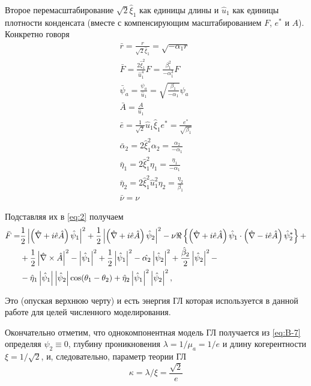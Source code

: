 Второе перемасштабирование \( \sqrt{2}\hat{\xi}_1 \) как единицы длины
и \( \hat{u}_1 \) как единицы плотности конденсата (вместе с компенсирующим
масштабированием \( F \), \( e^* \) и \( A \)). Конкретно говоря
\begin{gather}
  \bar{r} = \frac{r}{\sqrt{2}\hat{\xi}_1} = \sqrt{-\alpha_1 r} \nonumber \\
  \bar{F} = \frac{2\hat{\xi}^2_1}{\hat{u}^4_1}F =
    \frac{\beta^2_1}{-\alpha^3_1}F \nonumber \\
  \bar{\psi}_a = \frac{\psi_a}{\hat{u}_1} =
    \sqrt{\frac{\beta_1}{-\alpha_1}}\psi_a \nonumber \\
  \bar{A} = \frac{A}{\hat{u}_1} \\
  \bar{e} = \frac{1}{\sqrt{2}}\hat{u}_1\hat{\xi}_1 e^* =
    \frac{e^*}{\sqrt{\beta_1}} \nonumber \\
  \bar{\alpha}_2 = 2\hat{\xi}^2_1 \alpha_2 = \frac{\alpha_2}{-\alpha_1}
    \nonumber \\
  \bar{\eta}_1 = 2\hat{\xi}^2_1 \eta_1 = \frac{\eta_1}{-\alpha_1} \nonumber \\
  \bar{\eta}_2 = 2\hat{\xi}^2_1 \hat{u}^2_1 \eta_2 =
    \frac{\eta_2}{\beta_1} \nonumber \\
  \bar{\nu} = \nu \label{eq:B-6}
\end{gather}

Подставляя их в \eqref{eq:2} получаем
\begin{align}
  \bar{F} = & \frac{1}{2}\left| \left( \hat{\nabla} + i\hat{e}\hat{A} \right)
    \hat{\psi}_1 \right|^2 + \frac{1}{2}\left| \left( \hat{\nabla} + i\hat{e}\hat{A}
    \right)\hat{\psi}_2 \right|^2 - \nu\Re\left\{ \left( \hat{\nabla} + i\hat{e}\hat{A}
    \right) \hat{\psi}_1 \cdot \left( \hat{\nabla} - i\hat{e}\hat{A} \right)
    \hat{\psi}^*_2 \right\} + \nonumber \\
  & + \frac{1}{2}\left| \hat{\nabla}\times\hat{A} \right|^2 - \left| \hat{\psi}_1 \right|^2 +
    \frac{1}{2}\left| \hat{\psi}_1 \right|^2 - \hat{\alpha_2}\left| \hat{\psi}_2 \right|^2 +
    \frac{\hat{\beta}_2}{2}\left| \hat{\psi}_2 \right|^2 - \nonumber \\
  & - \hat{\eta}_1\left| \hat{\psi}_1 \right|\left| \hat{\psi}_2 \right| \cos(\theta_1 - \theta_2)
    + \hat{\eta}_2\left| \hat{\psi}_1 \right|^2 \left| \hat{\psi}_2 \right|^2, \label{eq:B-7}
\end{align}

Это (опуская верхнюю черту) и есть энергия ГЛ которая используется в данной 
работе для целей численного моделирования.

Окончательно отметим, что однокомпонентная модель ГЛ получается из 
\eqref{eq:B-7} определяя \( \psi_2 \equiv 0 \), глубину проникновения
\( \lambda = 1/\mu_a = 1/e \) и длину когерентности
\( \xi = 1/\sqrt{2} \), и, следовательно, параметр теории ГЛ
\begin{equation}
  \kappa = \lambda/\xi = \frac{\sqrt{2}}{e}
  \label{eq:B-8}
\end{equation}

